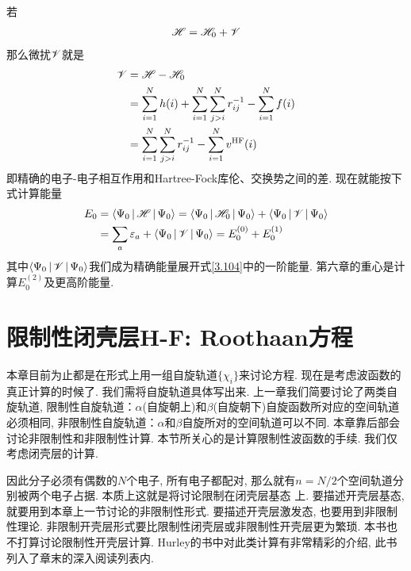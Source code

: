 若
\begin{align}
	\mathscr{H} = \mathscr{H}_0 + \mathscr{V}
\end{align}
那么微扰$\mathscr{V}$就是
\begin{align}
	\mathscr{V} & = \mathscr{H} -\mathscr{H}_0\notag\\
	& = \sum_{i=1}^{N}h(i) + \sum_{i=1}^{N}\sum_{j>i}^{N}r_{ij}^{-1} - \sum_{i=1}^{N}f(i)\notag\\
	& = \sum_{i=1}^{N}\sum_{j>i}^{N}r_{ij}^{-1} - \sum_{i=1}^{N}v^\mathrm{HF}(i)
	\label{3.108}
\end{align}
即精确的电子-电子相互作用和Hartree-Fock库伦、交换势之间的差. 
现在就能按下式计算\hft 能量
\begin{align}
	E_0 & = \Braket{\Psi_0|\mathscr{H}|\Psi_0} = \Braket{\Psi_0|\mathscr{H}_0|\Psi_0} + \Braket{\Psi_0|\mathscr{V}|\Psi_0} \notag\\
	& = \sum_a\varepsilon_a + \Braket{\Psi_0|\mathscr{V}|\Psi_0} = E_0^{(0)} + E_0^{(1)}
\end{align}
其中$\Braket{\Psi_0|\mathscr{V}|\Psi_0}$我们成为精确能量展开式\eqref{3.104}中的一阶能量. 
第六章的重心是计算$E_0^{(2)}$及更高阶能量.

\section{限制性闭壳层H-F: Roothaan方程}
本章目前为止都是在形式上用一组自旋轨道$\{\chi_i\}$来讨论\hft 方程. 
现在是考虑\hft 波函数的真正计算的时候了. 
我们需将自旋轨道具体写出来. 
上一章我们简要讨论了两类自旋轨道, 
限制性自旋轨道：$\alpha$(自旋朝上)和$\beta$(自旋朝下)自旋函数所对应的空间轨道必须相同, 
非限制性自旋轨道：$\alpha$和$\beta$自旋所对的空间轨道可以不同. 
本章靠后部会讨论非限制性\hft 和非限制性\hft 计算. 
本节所关心的是计算限制性\hft 波函数的手续. 
我们仅考虑闭壳层的计算.

因此分子必须有偶数的$N$个电子, 所有电子都配对, 那么就有$n=N/2$个空间轨道分别被两个电子占据. 本质上这就是将讨论限制在闭壳层基态
上. 
要描述开壳层基态, 就要用到本章上一节讨论的非限制性形式. 
要描述开壳层激发态, 也要用到非限制性\hft 理论. 
非限制开壳层形式要比限制性闭壳层或非限制性开壳层更为繁琐. 
本书也不打算讨论限制性开壳层\hft 计算. 
Hurley的书中对此类计算有非常精彩的介绍, 此书列入了章末的深入阅读列表内.

